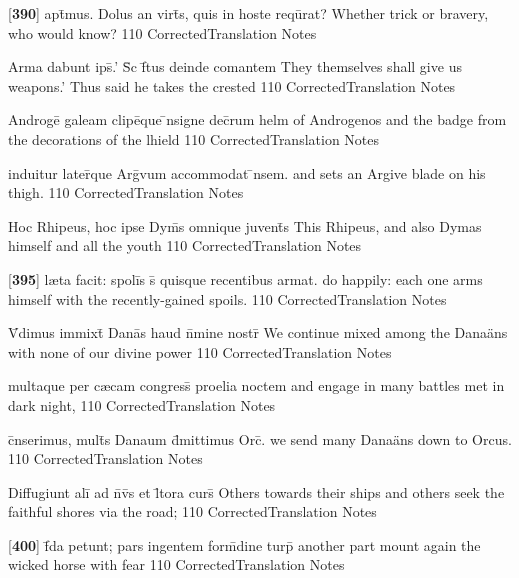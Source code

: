 \latline
  {[\textbf{390}] apt\={}mus.  Dolus an virt\={}s, quis in hoste requ\={\macron {\i}}rat?}
  { Whether trick or bravery, who would know? }
  {110}
  { CorrectedTranslation }
  { Notes }


\latline
  {Arma dabunt ips\={\macron {\i}}.'  S\={\macron {\i}}c f\={}tus deinde comantem}
  { They themselves shall give us weapons.'  Thus said he takes the crested}
  {110}
  { CorrectedTranslation }
  { Notes }


\latline
  {Androge\={} galeam clipe\={\macron {\i}}que \={\macron {\i}}nsigne dec\={}rum}
  { helm of Androgenos and the badge from the decorations of the lhield }
  {110}
  { CorrectedTranslation }
  { Notes }


\latline
  {induitur later\={\macron {\i}}que Arg\={\macron {\i}}vum accommodat \={}nsem.  }
  { and sets an Argive blade on his thigh. }
  {110}
  { CorrectedTranslation }
  { Notes }


\latline
  {Hoc Rhipeus, hoc ipse Dym\={}s omnique juvent\={}s}
  { This Rhipeus, and also Dymas himself and all the youth  }
  {110}
  { CorrectedTranslation }
  { Notes }


\latline
  {[\textbf{395}] l{\ae}ta facit:  spoli\={\macron {\i}}s s\={} quisque recentibus armat.}
  { do happily:  each one arms himself with the recently-gained spoils. }
  {110}
  { CorrectedTranslation }
  { Notes }


\latline
  {V\={}dimus immixt\={\macron {\i}} Dana\={\macron {\i}}s haud n\={}mine nostr\={}}
  { We continue mixed among the Dana\"ans with none of our divine power }
  {110}
  { CorrectedTranslation }
  { Notes }


\latline
  {multaque per c{\ae}cam congress\={\macron {\i}} proelia noctem}
  { and engage in many battles met in dark night, }
  {110}
  { CorrectedTranslation }
  { Notes }


\latline
  {c\={}nserimus, mult\={}s Danaum d\={}mittimus Orc\={}.}
  { we send many Dana\"ans down to Orcus. }
  {110}
  { CorrectedTranslation }
  { Notes }


\latline
  {Diffugiunt ali\={\macron {\i}} ad n\={}v\={\macron {\i}}s et l\={\macron {\i}}tora curs\={}}
  { Others towards their ships and others seek the faithful shores via the road;  }
  {110}
  { CorrectedTranslation }
  { Notes }


\latline
  {[\textbf{400}] f\={\macron {\i}}da petunt; pars ingentem form\={\macron {\i}}dine turp\={\macron {\i}}}
  { another part mount again the wicked horse with fear  }
  {110}
  { CorrectedTranslation }
  { Notes }


